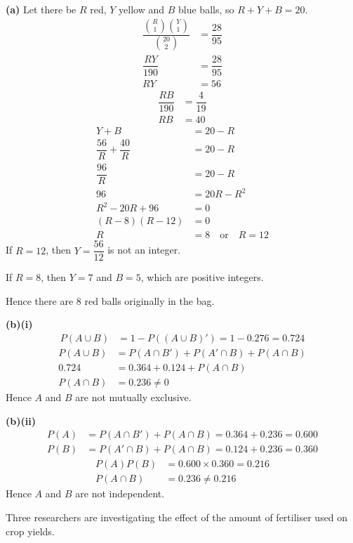 \documentclass[a4paper,11pt,oneside]{article}
\newcommand{\Qhead}[1]{\par\needspace{14\baselineskip}\medskip\noindent{\large\bfseries #1}\par\smallskip}
\newcommand{\partlabel}[1]{\par\needspace{3\baselineskip}\smallskip\noindent\textbf{#1}\quad}
\begin{document}
\begin{solbox}
\partlabel{(a)}
Let there be $R$ red, $Y$ yellow and $B$ blue balls, so $R+Y+B=20$.
\begin{align*}
\dfrac{\binom{R}{1}\binom{Y}{1}}{\binom{20}{2}} &= \dfrac{28}{95}\\
\dfrac{RY}{190} &= \dfrac{28}{95}\\
RY &= 56
\end{align*}
\begin{align*}
\dfrac{RB}{190} &= \dfrac{4}{19}\\
RB &= 40
\end{align*}
\begin{align*}
Y + B &= 20 - R\\
\dfrac{56}{R} + \dfrac{40}{R} &= 20 - R\\
\dfrac{96}{R} &= 20 - R\\
96 &= 20R - R^2\\
R^2 - 20R + 96 &= 0\\
(R-8)(R-12) &= 0\\
R &= 8\quad\text{or}\quad R=12
\end{align*}
If $R=12$, then $Y=\dfrac{56}{12}$ is not an integer.

If $R=8$, then $Y=7$ and $B=5$, which are positive integers.

Hence there are $8$ red balls originally in the bag.
\partlabel{(b)(i)}
\begin{align*}
P(A\cup B) &= 1 - P((A\cup B)') = 1 - 0.276 = 0.724
\end{align*}
\begin{align*}
P(A\cup B) &= P(A\cap B') + P(A'\cap B) + P(A\cap B)\\
0.724 &= 0.364 + 0.124 + P(A\cap B)\\
P(A\cap B) &= 0.236 \neq 0
\end{align*}
Hence $A$ and $B$ are not mutually exclusive.
\partlabel{(b)(ii)}
\begin{align*}
P(A) &= P(A\cap B') + P(A\cap B) = 0.364 + 0.236 = 0.600\\
P(B) &= P(A'\cap B) + P(A\cap B) = 0.124 + 0.236 = 0.360
\end{align*}
\begin{align*}
P(A)P(B) &= 0.600\times 0.360 = 0.216\\
P(A\cap B) &= 0.236 \neq 0.216
\end{align*}
Hence $A$ and $B$ are not independent.
\end{solbox}
\clearpage
\Qhead{8}
Three researchers are investigating the effect of the amount of fertiliser used on crop yields.
\end{document}
